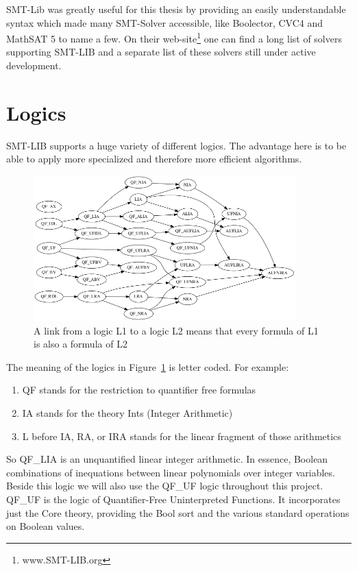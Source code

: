 SMT-Lib was greatly useful for this thesis by providing an easily understandable syntax which made many SMT-Solver accessible, like Boolector, CVC4 and MathSAT 5 to name a few. On their web-site\footnote{www.SMT-LIB.org} one can find a long list of solvers supporting SMT-LIB and a separate list of these solvers still under active development.

\section{Logics}
SMT-LIB supports a huge variety of different logics. The advantage here is to be able to apply more specialized and therefore more efficient algorithms.
\begin{figure}
  \centering
  \includegraphics[width=0.9\textwidth]{Pictures/logics.png}  
  \caption{A link from a logic L1 to a logic L2 means that every formula of L1 is also a formula of L2}
  \label{fig:logics}
\end{figure}
The meaning of the logics in Figure~\ref{fig:logics} is letter coded. For example:
\begin{enumerate}
  \item QF stands for the restriction to quantifier free formulas
  \item IA stands for the theory Ints (Integer Arithmetic)
  \item L before IA, RA, or IRA stands for the linear fragment of those arithmetics 
\end{enumerate}
So QF\_LIA is an unquantified linear integer arithmetic. In essence, Boolean combinations of inequations between linear polynomials over integer variables. Beside this logic we will also use the QF\_UF logic throughout this project. QF\_UF is the logic of Quantifier-Free Uninterpreted Functions. It incorporates just the Core theory, providing the Bool sort and the various standard operations on Boolean values.
 
